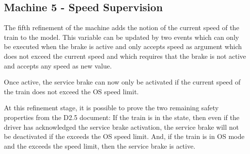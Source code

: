 \documentclass{template/openetcs_article}
\begin{document}
{\footnotesize

}

\subsection{Machine 5 - Speed Supervision}
\label{sec:machine-5-speed}

The fifth refinement of the machine adds the notion of the current speed of the
train to the model. This variable can be updated by two events
 which can only be executed when the brake
is active and only accepts speed as argument which does not exceed the current
speed and  which requires that the brake
is not active and accepts any speed as new value.

Once active, the service brake can now only be activated if the current speed of
the train does not exceed the OS speed limit.

{\footnotesize

}

At this refinement stage, it is possible to prove the two remaining safety
properties from the D2.5 document: If the train is in the
 state, then even if the driver has
acknowledged the service brake activation, the service brake will not be
deactivated if the  exceeds the OS speed limit. And, if the
train is in OS mode and the  exceeds the speed limit, then
the service brake is active.



\end{document}
